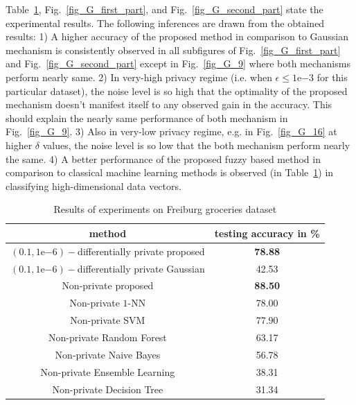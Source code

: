Table~\ref{table_results_grocery_images}, Fig.~\ref{fig_G_first_part}, and Fig.~\ref{fig_G_second_part} state the experimental results. The following inferences are drawn from the obtained results: 1) A higher accuracy of the proposed method in comparison to Gaussian mechanism is consistently observed in all subfigures of Fig.~\ref{fig_G_first_part} and Fig.~\ref{fig_G_second_part} except in Fig.~\ref{fig_G_9} where both mechanisms perform nearly same. 2) In very-high privacy regime (i.e. when $\epsilon \leq 1\mathrm{e}{-3}$ for this particular dataset), the noise level is so high that the optimality of the proposed mechanism doesn't manifest itself to any observed gain in the accuracy. This should explain the nearly same performance of both mechanism in Fig.~\ref{fig_G_9}. 3) Also in very-low privacy regime, e.g. in Fig.~\ref{fig_G_16} at higher $\delta$ values, the noise level is so low that the both mechanism perform nearly the same. 4) A better performance of the proposed fuzzy based method in comparison to classical machine learning methods is observed (in Table~\ref{table_results_grocery_images}) in classifying high-dimensional data vectors. 
\begin{table}
\renewcommand{\arraystretch}{1.3}
\caption{Results of experiments on Freiburg groceries dataset}
\label{table_results_grocery_images} \centering
\begin{tabular}{c||c}
\hline
\bfseries method  & \bfseries testing accuracy in \%   \\
\hline \hline  
$(0.1,1\mathrm{e}{-6})-$differentially private proposed & \textbf{78.88} \\
$(0.1,1\mathrm{e}{-6})-$differentially private Gaussian & 42.53 \\
Non-private proposed &  \textbf{88.50} \\
Non-private $1$-NN & 78.00      \\
Non-private SVM & 77.90      \\
Non-private Random Forest &  63.17   \\
Non-private Naive Bayes & 56.78    \\
Non-private Ensemble Learning & 38.31     \\
Non-private Decision Tree & 31.34   \\
\hline \hline
\end{tabular}
\end{table} 
